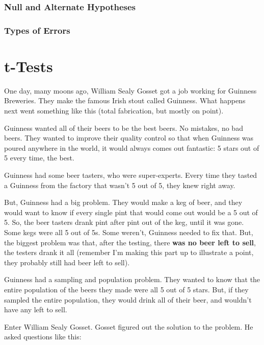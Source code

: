 \documentclass[]{book}
\begin{document}
\hypertarget{null-and-alternate-hypotheses}{%
\subsection{Null and Alternate Hypotheses}\label{null-and-alternate-hypotheses}}

\hypertarget{types-of-errors}{%
\subsection{Types of Errors}\label{types-of-errors}}

\hypertarget{t-tests}{%
\chapter{t-Tests}\label{t-tests}}

One day, many moons ago, William Sealy Gosset got a job working for Guinness Breweries. They make the famous Irish stout called Guinness. What happens next went something like this (total fabrication, but mostly on point).

Guinness wanted all of their beers to be the best beers. No mistakes, no bad beers. They wanted to improve their quality control so that when Guinness was poured anywhere in the world, it would always comes out fantastic: 5 stars out of 5 every time, the best.

Guinness had some beer tasters, who were super-experts. Every time they tasted a Guinness from the factory that wasn't 5 out of 5, they knew right away.

But, Guinness had a big problem. They would make a keg of beer, and they would want to know if every single pint that would come out would be a 5 out of 5. So, the beer tasters drank pint after pint out of the keg, until it was gone. Some kegs were all 5 out of 5s. Some weren't, Guinness needed to fix that. But, the biggest problem was that, after the testing, there \textbf{was no beer left to sell}, the testers drank it all (remember I'm making this part up to illustrate a point, they probably still had beer left to sell).

Guinness had a sampling and population problem. They wanted to know that the entire population of the beers they made were all 5 out of 5 stars. But, if they sampled the entire population, they would drink all of their beer, and wouldn't have any left to sell.

Enter William Sealy Gosset. Gosset figured out the solution to the problem. He asked questions like this:
\end{document}
